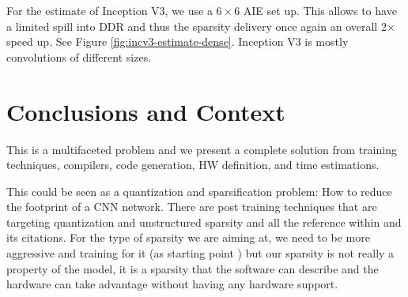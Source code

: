 \documentclass[conference]{IEEEtran}
\begin{document}
For the estimate of Inception V3, we use a $6\times 6$ AIE set up.
This allows to have a limited spill into DDR and thus the sparsity
delivery once again an overall 2$\times$ speed up. See Figure
\ref{fig:incv3-estimate-dense}. Inception V3 is mostly convolutions of
different sizes.







\section{Conclusions and Context}
This is a multifaceted problem and we present a complete solution from
training techniques, compilers, code generation, HW definition, and
time estimations.

This could be seen as a quantization and sparsification problem: How
to reduce the footprint of a CNN network. There are post training
techniques that are targeting quantization and unstructured sparsity
\cite{frantar2023gptq} and all the reference within and its
citations. For the type of sparsity we are aiming at, we need to be
more aggressive and training for it (as starting point
\cite{abs-2102-11289}) but our sparsity is not really a property of the
model, it is a sparsity that the software can describe and the
hardware can take advantage without having any hardware support.
\end{document}

